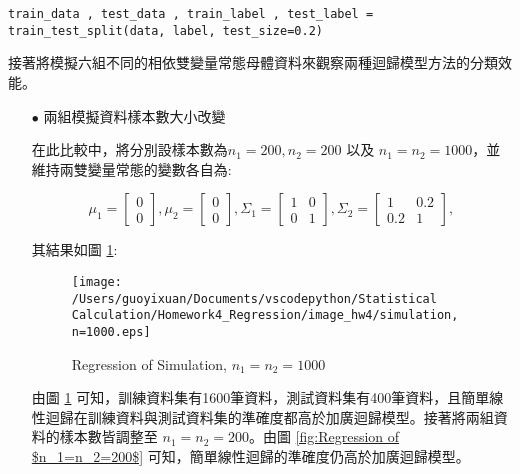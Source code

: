 \bigskip
\begin{lstlisting}
train_data , test_data , train_label , test_label = train_test_split(data, label, test_size=0.2)
\end{lstlisting}

接著將模擬六組不同的相依雙變量常態母體資料來觀察兩種迴歸模型方法的分類效能。

\begin{itemize}
\item[$\bullet$] 兩組模擬資料樣本數大小改變

在此比較中，將分別設樣本數為$n_1=200, n_2=200$ 以及 $n_1=n_2=1000$，並維持兩雙變量常態的變數各自為:

$$ \mu_1 = \left[
            \begin{array}{clr}
                0  \\
                0 
            \end{array} \right] ,
            \mu_2 = \left[
            \begin{array}{clr}
                0  \\
                0 
            \end{array} \right] ,
            \Sigma_1 = \left[
            \begin{array}{clr}
                1 & 0  \\
                0 & 1
            \end{array} \right] ,
            \Sigma_2 = \left[
            \begin{array}{clr}
                1 & 0.2  \\
                0.2 & 1 
            \end{array} \right] ,$$ 

其結果如圖 \ref{fig:Regression of $n_1=n_2=1000$}:

\begin{figure}[H]
    \centering
        \texttt{[image: /Users/guoyixuan/Documents/vscodepython/Statistical Calculation/Homework4\_Regression/image\_hw4/simulation, n=1000.eps]}
    \caption{Regression of Simulation, $n_1=n_2=1000$}
    \label{fig:Regression of $n_1=n_2=1000$}
\end{figure}

由圖 \ref{fig:Regression of $n_1=n_2=1000$} 可知，訓練資料集有1600筆資料，測試資料集有400筆資料，且簡單線性迴歸在訓練資料與測試資料集的準確度都高於加廣迴歸模型。接著將兩組資料的樣本數皆調整至 $n_1=n_2=200$。由圖 \ref{fig:Regression of $n_1=n_2=200$} 可知，簡單線性迴歸的準確度仍高於加廣迴歸模型。


\end{itemize}
